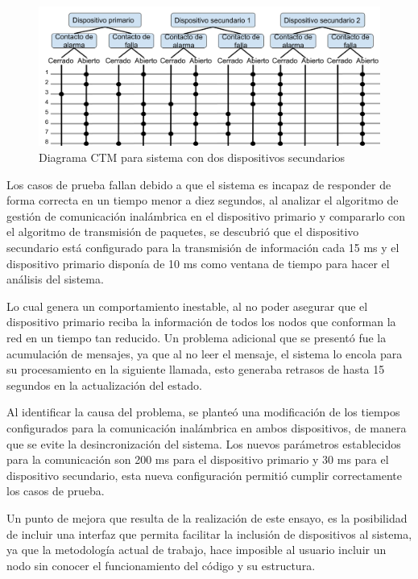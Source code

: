 \begin{figure}[ht]
	\centering
	\includegraphics[scale=.35]{./Figures/Capitulo4/Figura_L.png}
	\caption{Diagrama CTM para sistema con dos dispositivos secundarios}
	\label{fig:figura_l}
\end{figure}

Los casos de prueba fallan debido a que el sistema es incapaz de responder de forma correcta en un tiempo menor a diez segundos, al analizar el algoritmo de gestión de comunicación inalámbrica en el dispositivo primario y compararlo con el algoritmo de transmisión de paquetes, se descubrió que el dispositivo secundario está configurado para la transmisión de información cada 15 ms y el dispositivo primario disponía de 10 ms como ventana de tiempo para hacer el análisis del sistema.

Lo cual genera un comportamiento inestable, al no poder asegurar que el dispositivo primario reciba la información de todos los nodos que conforman la red en un tiempo tan reducido.
Un problema adicional que se presentó fue la acumulación de mensajes, ya que al no leer el mensaje, el sistema lo encola para su procesamiento en la siguiente llamada, esto generaba retrasos de hasta 15 segundos en la actualización del estado.

Al identificar la causa del problema, se planteó una modificación de los tiempos configurados para la comunicación inalámbrica en ambos dispositivos, de manera que se evite la desincronización del sistema. Los nuevos parámetros establecidos para la comunicación son 200 ms para el dispositivo primario y 30 ms para el dispositivo secundario, esta nueva configuración permitió cumplir correctamente los casos de prueba. 
      
Un punto de mejora que resulta de la realización de este ensayo, es la posibilidad de incluir una interfaz que permita facilitar la inclusión de dispositivos al sistema, ya que la metodología actual de trabajo, hace imposible al usuario incluir un nodo sin conocer el funcionamiento del código y su estructura.



